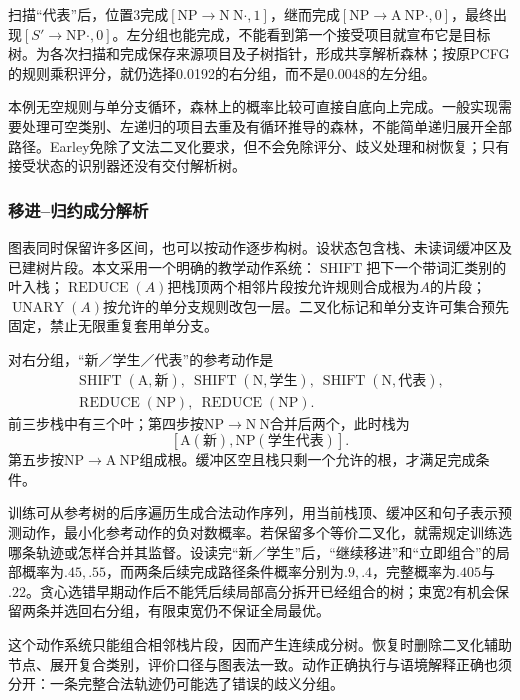 扫描“代表”后，位置3完成$[\mathrm{NP}\to\mathrm N\ \mathrm N\mathbin{\cdot},1]$，继而完成$[\mathrm{NP}\to\mathrm A\ \mathrm{NP}\mathbin{\cdot},0]$，最终出现$[S'\to\mathrm{NP}\mathbin{\cdot},0]$。左分组也能完成，不能看到第一个接受项目就宣布它是目标树。为各次扫描和完成保存来源项目及子树指针，形成共享解析森林；按原PCFG的规则乘积评分，就仍选择0.0192的右分组，而不是0.0048的左分组。

本例无空规则与单分支循环，森林上的概率比较可直接自底向上完成。一般实现需要处理可空类别、左递归的项目去重及有循环推导的森林，不能简单递归展开全部路径。Earley免除了文法二叉化要求，但不会免除评分、歧义处理和树恢复；只有接受状态的识别器还没有交付解析树。

\subsubsection{移进--归约成分解析}
\label{sec:nlp-analysis-shift-reduce}

图表同时保留许多区间，也可以按动作逐步构树。设状态包含栈、未读词缓冲区及已建树片段。本文采用一个明确的教学动作系统：$\operatorname{SHIFT}$把下一个带词汇类别的叶入栈；$\operatorname{REDUCE}(A)$把栈顶两个相邻片段按允许规则合成根为$A$的片段；$\operatorname{UNARY}(A)$按允许的单分支规则改包一层。二叉化标记和单分支许可集合预先固定，禁止无限重复套用单分支。

对右分组，“新／学生／代表”的参考动作是
\[
\begin{gathered}
 \operatorname{SHIFT}(\mathrm A,\text{新}),\
 \operatorname{SHIFT}(\mathrm N,\text{学生}),\
 \operatorname{SHIFT}(\mathrm N,\text{代表}),\\
 \operatorname{REDUCE}(\mathrm{NP}),\
 \operatorname{REDUCE}(\mathrm{NP}).
\end{gathered}
\]
前三步栈中有三个叶；第四步按$\mathrm{NP}\to\mathrm N\ \mathrm N$合并后两个，此时栈为
\[
 [\mathrm A(\text{新}),\mathrm{NP}(\text{学生代表})].
\]
第五步按$\mathrm{NP}\to\mathrm A\ \mathrm{NP}$组成根。缓冲区空且栈只剩一个允许的根，才满足完成条件。

训练可从参考树的后序遍历生成合法动作序列，用当前栈顶、缓冲区和句子表示预测动作，最小化参考动作的负对数概率。若保留多个等价二叉化，就需规定训练选哪条轨迹或怎样合并其监督。设读完“新／学生”后，“继续移进”和“立即组合”的局部概率为$.45,.55$，而两条后续完成路径条件概率分别为$.9,.4$，完整概率为$.405$与$.22$。贪心选错早期动作后不能凭后续局部高分拆开已经组合的树；束宽2有机会保留两条并选回右分组，有限束宽仍不保证全局最优。

这个动作系统只能组合相邻栈片段，因而产生连续成分树。恢复时删除二叉化辅助节点、展开复合类别，评价口径与图表法一致。动作正确执行与语境解释正确也须分开：一条完整合法轨迹仍可能选了错误的歧义分组。

